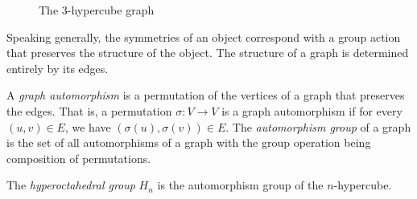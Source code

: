 \documentclass[cclicense]{hmcthesis}
\newcommand*{\x}[1]{\ensuremath{X^{(#1)}}}
\numberwithin{equation}{chapter}
\numberwithin{thmcounter}{chapter}
\begin{document}
    \begin{figure}[h]
        \centering


        \caption{The $3$-hypercube graph}
        \label{fig:hypercube}
    \end{figure}
    
    Speaking generally, the symmetries of an object correspond with a group
    action that preserves the structure of the object.  The structure of a graph
    is determined entirely by its edges.
    \begin{definition}
        A \emph{graph automorphism} is a permutation of the vertices of a graph
        that preserves the edges.  That is, a permutation $\sigma: V \to V$ is a
        graph automorphism if for every $(u, v) \in E$, we have $(\sigma(u),
        \sigma(v)) \in E$.
        The \emph{automorphism group} of a graph is the set of all
        automorphisms of a graph with the group operation being composition of
        permutations.
    \end{definition}

    \begin{definition}
        The \emph{hyperoctahedral group} $H_n$ is the automorphism group of the
        $n$-hypercube.
    \end{definition}
\end{document}
